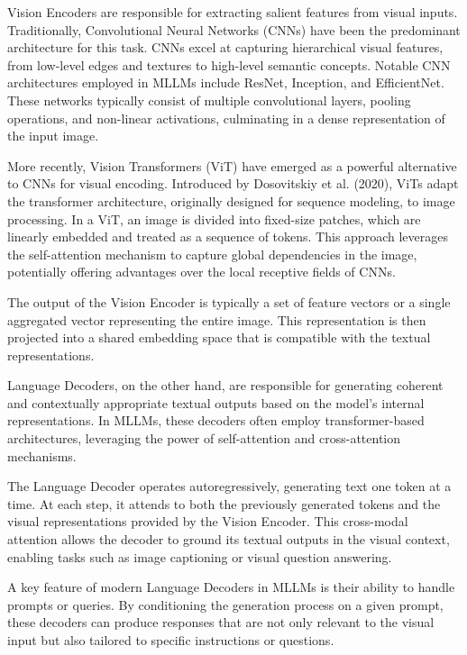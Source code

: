 Vision Encoders are responsible for extracting salient features from visual inputs. Traditionally, Convolutional Neural Networks (CNNs) have been the predominant architecture for this task. CNNs excel at capturing hierarchical visual features, from low-level edges and textures to high-level semantic concepts. Notable CNN architectures employed in MLLMs include ResNet, Inception, and EfficientNet. These networks typically consist of multiple convolutional layers, pooling operations, and non-linear activations, culminating in a dense representation of the input image.

More recently, Vision Transformers (ViT) have emerged as a powerful alternative to CNNs for visual encoding. Introduced by Dosovitskiy et al. (2020), ViTs adapt the transformer architecture, originally designed for sequence modeling, to image processing. In a ViT, an image is divided into fixed-size patches, which are linearly embedded and treated as a sequence of tokens. This approach leverages the self-attention mechanism to capture global dependencies in the image, potentially offering advantages over the local receptive fields of CNNs.

The output of the Vision Encoder is typically a set of feature vectors or a single aggregated vector representing the entire image. This representation is then projected into a shared embedding space that is compatible with the textual representations.

Language Decoders, on the other hand, are responsible for generating coherent and contextually appropriate textual outputs based on the model's internal representations. In MLLMs, these decoders often employ transformer-based architectures, leveraging the power of self-attention and cross-attention mechanisms.

The Language Decoder operates autoregressively, generating text one token at a time. At each step, it attends to both the previously generated tokens and the visual representations provided by the Vision Encoder. This cross-modal attention allows the decoder to ground its textual outputs in the visual context, enabling tasks such as image captioning or visual question answering.

A key feature of modern Language Decoders in MLLMs is their ability to handle prompts or queries. By conditioning the generation process on a given prompt, these decoders can produce responses that are not only relevant to the visual input but also tailored to specific instructions or questions.

